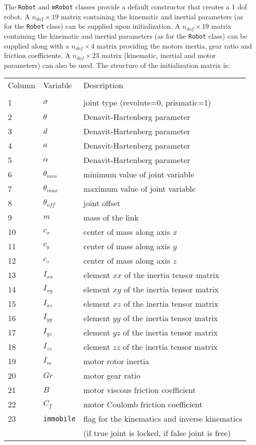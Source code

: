 \documentclass[dvips,11pt,fleqn]{report}
\begin{document}
The \texttt{Robot} and \texttt{mRobot} classes provide a default
constructor that creates a 1 dof robot.  A $n_{dof} \times 19$ matrix
containing the kinematic and inertial parameters (as for the
\texttt{Robot} class) can be supplied upon initialization. A $n_{dof}
\times 19$ matrix containing the kinematic and inertial parameters (as
for the \texttt{Robot} class) can be supplied along with a $n_{dof}
\times 4$ matrix providing the motors inertia, gear ratio and friction
coefficients. A $n_{dof} \times 23$ matrix (kinematic, inertial and
motor parameters) can also be used.  The structure of the
initialization matrix is:

\vspace{0.2in}

\begin{tabular}{lll}
Column & Variable & Description \\
\\
1 & $\sigma$ & joint type (revolute=0, prismatic=1) \\
2 & $\theta$ & Denavit-Hartenberg parameter \\
3 & $d$ & Denavit-Hartenberg parameter \\
4 & $a$ & Denavit-Hartenberg parameter \\
5 & $\alpha$ & Denavit-Hartenberg parameter \\
6 & $\theta_{min}$ & minimum value of joint variable \\
7 & $\theta_{max}$ & maximum value of joint variable \\
8 & $\theta_{off}$ & joint offset \\
9 & $m$ & mass of the link \\
10 & $c_x$ & center of mass along axis $x$ \\
11 & $c_y$ & center of mass along axis $y$ \\
12 & $c_z$ & center of mass along axis $z$ \\
13 & $I_{xx}$ & element $xx$ of the inertia tensor matrix \\
14 & $I_{xy}$ & element $xy$ of the inertia tensor matrix \\
15 & $I_{xz}$ & element $xz$ of the inertia tensor matrix \\
16 & $I_{yy}$ & element $yy$ of the inertia tensor matrix \\
17 & $I_{yz}$ & element $yz$ of the inertia tensor matrix \\
18 & $I_{zz}$ & element $zz$ of the inertia tensor matrix \\
19 & $I_m$ & motor rotor inertia \\
20 & $Gr$ & motor gear ratio \\
21 & $B$ & motor viscous friction coefficient \\
22 & $C_f$ & motor Coulomb friction coefficient \\
23 & \texttt{immobile} & flag for the kinematics and inverse kinematics \\
& & (if true joint is locked, if false joint is free)
\end{tabular}
\end{document}
